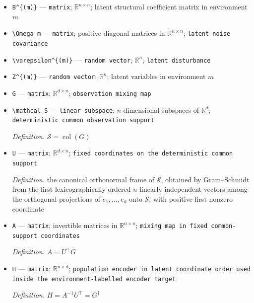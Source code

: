 \documentclass{article}
\begin{document}
\begin{itemize}
  \par\smallskip\noindent\emph{Definition.} \(\operatorname{TC}(\mathcal G_{\mathcal E})=I^{-1}\operatorname{TC}(\mathcal G)I\)
  \item \texttt{B\textasciicircum{}\{(m)\}\allowbreak{}} --- \texttt{matrix}; \(\mathbb R^{n\times n}\); latent structural coefficient matrix in environment \(m\)
  \item \texttt{\textbackslash{}\allowbreak{}Omega\_\allowbreak{}m} --- \texttt{matrix}; positive diagonal matrices in \(\mathbb R^{n\times n}\); \texttt{latent noise covariance}
  \item \texttt{\textbackslash{}\allowbreak{}varepsilon\textasciicircum{}\{(m)\}\allowbreak{}} --- \texttt{random vector}; \(\mathbb R^n\); \texttt{latent disturbance}
  \item \texttt{Z\textasciicircum{}\{(m)\}\allowbreak{}} --- \texttt{random vector}; \(\mathbb R^n\); latent variables in environment \(m\)
  \item \texttt{G} --- \texttt{matrix}; \(\mathbb R^{d\times n}\); \texttt{observation mixing map}
  \item \texttt{\textbackslash{}\allowbreak{}mathcal S} --- \texttt{linear subspace}; \(n\)-dimensional subspaces of \(\mathbb R^d\); \texttt{deterministic common observation support}
  \par\smallskip\noindent\emph{Definition.} \(\mathcal S=\operatorname{col}(G)\)
  \item \texttt{U} --- \texttt{matrix}; \(\mathbb R^{d\times n}\); \texttt{fixed coordinates on the deterministic common support}
  \par\smallskip\noindent\emph{Definition.} the canonical orthonormal frame of \(\mathcal S\), obtained by Gram--Schmidt from the first lexicographically ordered \(n\) linearly independent vectors among the orthogonal projections of \(e_1,\ldots,e_d\) onto \(\mathcal S\), with positive first nonzero coordinate
  \item \texttt{A} --- \texttt{matrix}; invertible matrices in \(\mathbb R^{n\times n}\); \texttt{mixing map in fixed common-\allowbreak{}support coordinates}
  \par\smallskip\noindent\emph{Definition.} \(A=U^{\top}G\)
  \item \texttt{H} --- \texttt{matrix}; \(\mathbb R^{n\times d}\); \texttt{population encoder in latent coordinate order used inside the environment-\allowbreak{}labelled encoder target}
  \par\smallskip\noindent\emph{Definition.} \(H=A^{-1}U^{\top}=G^{\dagger}\)

\end{itemize}
\end{document}
